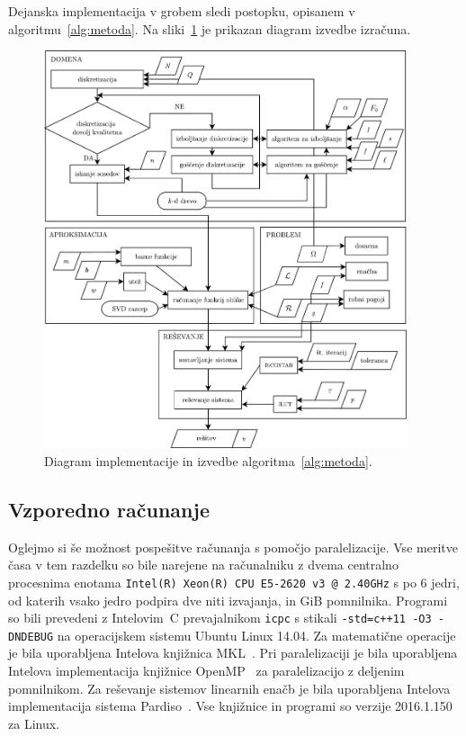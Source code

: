 \documentclass[12pt,a4paper,twoside]{article}
\theoremstyle{definition} %
\theoremstyle{plain} %
\numberwithin{equation}{section}
\newcommand{\CC}{C\nolinebreak\hspace{-.05em}\raisebox{.4ex}{\tiny\bf +}\nolinebreak\hspace{-.10em}\raisebox{.4ex}{\tiny\bf +}}
\begin{document}
Dejanska implementacija v grobem sledi postopku, opisanem v algoritmu~\ref{alg:metoda}. Na
sliki~\ref{fig:implementacija} je prikazan diagram izvedbe izračuna.

\begin{figure}[!h]
  \centering
  \vspace{-2ex}
  \includegraphics[width=0.95\textwidth]{images/diagram_finished.pdf}
  \vspace{-1ex}
  \caption[Diagram implementacije in izvedbe MLSM]{Diagram implementacije in
  izvedbe algoritma~\ref{alg:metoda}.}
  \label{fig:implementacija}
  \vspace{-5ex}
\end{figure}

\subsection{Vzporedno računanje}
Oglejmo si še možnost pospešitve računanja s pomočjo paralelizacije.
Vse meritve časa v tem razdelku so bile narejene na računalniku z dvema centralno procesnima enotama
\texttt{Intel(R) Xeon(R) CPU E5-2620 v3 @ 2.40GHz} s po 6 jedri, od katerih vsako jedro podpira dve
niti izvajanja, in \unit[64]{GiB} pomnilnika. Programi so bili prevedeni z Intelovim~\CC{}
prevajalnikom \texttt{icpc}  s stikali \texttt{-std=c++11 -O3 -DNDEBUG}
na operacijskem sistemu Ubuntu Linux 14.04. Za matematične operacije je bila uporabljena Intelova
knjižnica MKL~\cite{mkl}. Pri paralelizaciji je bila uporabljena Intelova implementacija knjižnice
OpenMP~\cite{dagum1998openmp} za paralelizacijo z deljenim pomnilnikom. Za reševanje sistemov
linearnih enačb je bila uporabljena Intelova implementacija sistema Pardiso~\cite{pardiso}. Vse
knjižnice in programi so verzije 2016.1.150 za Linux.
\end{document}
